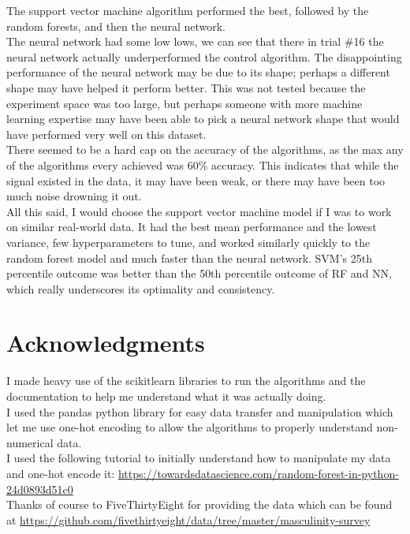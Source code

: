 \documentclass{article}
\begin{document}
The support vector machine algorithm performed the best, followed by the random forests, and then the neural network. \\

The neural network had some low lows, we can see that there in trial \#16 the neural network actually underperformed the control algorithm. The disappointing performance of the neural network may be due to its shape; perhaps a different shape may have helped it perform better. This was not tested because the experiment space was too large, but perhaps someone with more machine learning expertise may have been able to pick a neural network shape that would have performed very well on this dataset.\\

There seemed to be a hard cap on the accuracy of the algorithms, as the max any of the algorithms every achieved was 60\% accuracy. This indicates that while the signal existed in the data, it may have been weak, or there may have been too much noise drowning it out. \\

All this said, I would choose the support vector machine model if I was to work on similar real-world data. It had the best mean performance and the lowest variance, few hyperparameters to tune, and worked similarly quickly to the random forest model and much faster than the neural network. SVM's 25th percentile outcome was better than the 50th percentile outcome of RF and NN, which really underscores its optimality and consistency.

\section{Acknowledgments}

I made heavy use of the scikitlearn libraries to run the algorithms and the documentation to help me understand what it was actually doing. \\

I used the pandas python library for easy data transfer and manipulation which let me use one-hot encoding to allow the algorithms to properly understand non-numerical data.\\

I used the following tutorial to initially understand how to manipulate my data and one-hot encode it: \url{https://towardsdatascience.com/random-forest-in-python-24d0893d51c0}\\

Thanks of course to FiveThirtyEight for providing the data which can be found at \url{https://github.com/fivethirtyeight/data/tree/master/masculinity-survey}
\end{document}
